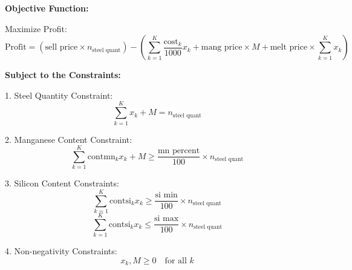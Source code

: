 \documentclass{article}
\begin{document}
\textbf{Objective Function:}

Maximize Profit:
\[
\text{Profit} = (\text{sell price} \times n_{\text{steel quant}}) - \left( \sum_{k=1}^{K} \frac{\text{cost}_k}{1000} x_k + \text{mang price} \times M + \text{melt price} \times \sum_{k=1}^{K} x_k \right)
\]

\textbf{Subject to the Constraints:}

1. Steel Quantity Constraint:
\[
\sum_{k=1}^{K} x_k + M = n_{\text{steel quant}}
\]

2. Manganese Content Constraint:
\[
\sum_{k=1}^{K} \text{contmn}_k x_k + M \geq \frac{\text{mn percent}}{100} \times n_{\text{steel quant}}
\]

3. Silicon Content Constraints:
\[
\sum_{k=1}^{K} \text{contsi}_k x_k \geq \frac{\text{si min}}{100} \times n_{\text{steel quant}}
\]
\[
\sum_{k=1}^{K} \text{contsi}_k x_k \leq \frac{\text{si max}}{100} \times n_{\text{steel quant}}
\]

4. Non-negativity Constraints:
\[
x_k, M \geq 0 \quad \text{for all } k
\]
\end{document}
